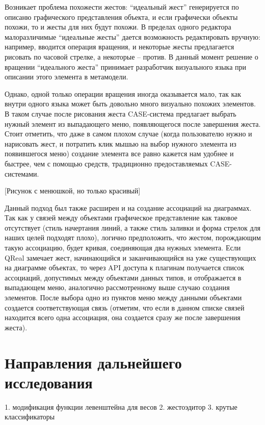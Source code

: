 \documentclass[a5paper]{article}
\begin{document}
Возникает проблема похожести жестов: ``идеальный жест'' генерируется по описаню графического представления объекта, и если графически 
объекты похожи, то и жесты для них будут похожи. В пределах одного редактора малоразличимые ``идеальные жесты'' дается возможность редактировать 
вручную: например, вводится операция вращения, и некоторые жесты предлагается рисовать по часовой стрелке, а некоторые -- против. В данный 
момент решение о вращении ``идеального жеста'' принимает разработчик визуального языка при описании этого элемента 
в метамодели. 

Однако, одной только операции вращения иногда оказывается мало, так как внутри одного языка может быть довольно много
визуально похожих элементов. В таком случае после рисования жеста CASE-система предлагает выбрать нужный элемент из выпадающего меню, 
появляющегося после завершения жеста. Стоит отметить, что даже в самом плохом случае (когда пользователю нужно и нарисовать жест, и
потратить клик мышью на выбор нужного элемента из появившегося меню) создание элемента все равно кажется нам удобнее и быстрее,
чем с помощью средств, традиционно предоставляемых CASE-системами.

[Рисунок с менюшкой, но только красивый]

Данный подход был также расширен и на создание ассоциаций на диаграммах. Так как у связей между объектами графическое представление
как таковое отсутствует (стиль начертания линий, а также стиль заливки и форма стрелок для наших целей подходят плохо), логично 
предположить, что жестом, порождающим такую ассоциацию, будет кривая, соединяющая два нужных элемента. Если QReal замечает жест,
начинающийся и заканчивающийся на уже существующих на диаграмме объектах, то через API доступа к плагинам получается список 
ассоциаций, допустимых между объектами данных типов, и отображается в выпадающем меню, аналогично рассмотренному выше случаю создания 
элементов. После выбора одно из пунктов меню между данными объектами создается соответствующая связь 
(отметим, что если в данном списке связей находится всего одна ассоциация, она создается сразу же после завершения жеста).

\section{Направления дальнейшего исследования}

1. модификация функции левенштейна для весов
2. жестоэдитор
3. крутые классификаторы

\pagebreak
\end{document}
